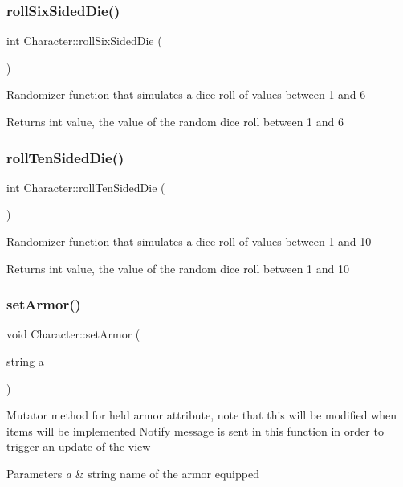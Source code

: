 \subsubsection{\texorpdfstring{roll\+Six\+Sided\+Die()}{rollSixSidedDie()}}
{\footnotesize\ttfamily int Character\+::roll\+Six\+Sided\+Die (\begin{DoxyParamCaption}{ }\end{DoxyParamCaption})}

Randomizer function that simulates a dice roll of values between 1 and 6 \begin{DoxyReturn}{Returns}
int value, the value of the random dice roll between 1 and 6 
\end{DoxyReturn}
\hypertarget{class_character_a6ab4e58439f6c394dc79f6a23440ef70}{}\label{class_character_a6ab4e58439f6c394dc79f6a23440ef70} 
\subsubsection{\texorpdfstring{roll\+Ten\+Sided\+Die()}{rollTenSidedDie()}}
{\footnotesize\ttfamily int Character\+::roll\+Ten\+Sided\+Die (\begin{DoxyParamCaption}{ }\end{DoxyParamCaption})}

Randomizer function that simulates a dice roll of values between 1 and 10 \begin{DoxyReturn}{Returns}
int value, the value of the random dice roll between 1 and 10 
\end{DoxyReturn}
\hypertarget{class_character_af8a31bf573e0f2dc03e904165997bb21}{}\label{class_character_af8a31bf573e0f2dc03e904165997bb21} 
\subsubsection{\texorpdfstring{set\+Armor()}{setArmor()}}
{\footnotesize\ttfamily void Character\+::set\+Armor (\begin{DoxyParamCaption}\item[{string}]{a }\end{DoxyParamCaption})}

Mutator method for held armor attribute, note that this will be modified when items will be implemented Notify message is sent in this function in order to trigger an update of the view 
\begin{DoxyParams}{Parameters}
{\em a} & string name of the armor equipped \\
\hline
\end{DoxyParams}
\hypertarget{class_character_a611fea965a72947c1b53b79ee095f95e}{}\label{class_character_a611fea965a72947c1b53b79ee095f95e} 
